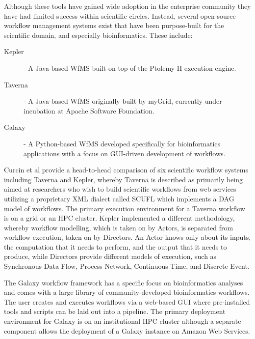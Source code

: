 Although these tools have gained wide adoption in the enterprise community they have had limited success within scientific circles. Instead, several open-source workflow management systems exist that have been purpose-built for the scientific domain, and especially bioinformatics. These include:

\begin{description}
\item[Kepler\autocite{ludascher2006scientific}] - A Java-based WfMS built on top of the Ptolemy II\autocite{davis1999overview} execution engine.
\item[Taverna\autocite{oinn2004taverna}] - A Java-based WfMS originally built by myGrid, currently under incubation at Apache Software Foundation. 
\item[Galaxy\autocite{goecks2010galaxy}] - A Python-based WfMS developed specifically for bioinformatics applications with a focus on GUI-driven development of workflows.
\end{description}

Curcin et al\autocite{curcin2008scientific} provide a head-to-head comparison of six scientific workflow systems including Taverna and Kepler, whereby Taverna is described as primarily being aimed at researchers who wish to build scientific workflows from web services utilizing a proprietary XML dialect called SCUFL which implements a DAG model of workflows. The primary execution environment for a Taverna workflow is on a grid or an HPC cluster. Kepler implemented a different methodology, whereby workflow modelling, which is taken on by Actors, is separated from workflow execution, taken on by Directors. An Actor knows only about its inputs, the computation that it needs to perform, and the output that it needs to produce, while Directors provide different models of execution, such as Synchronous Data Flow, Process Network, Continuous Time, and Discrete Event.

The Galaxy workflow framework has a specific focus on bioinformatics analyses and comes with a large library of community-developed bioinformatics workflows. The user creates and executes workflows via a web-based GUI where pre-installed tools and scripts can be laid out into a pipeline. The primary deployment environment for Galaxy is on an institutional HPC cluster although a separate component allows the deployment of a Galaxy instance on Amazon Web Services\autocite{afgan2010galaxy}.


